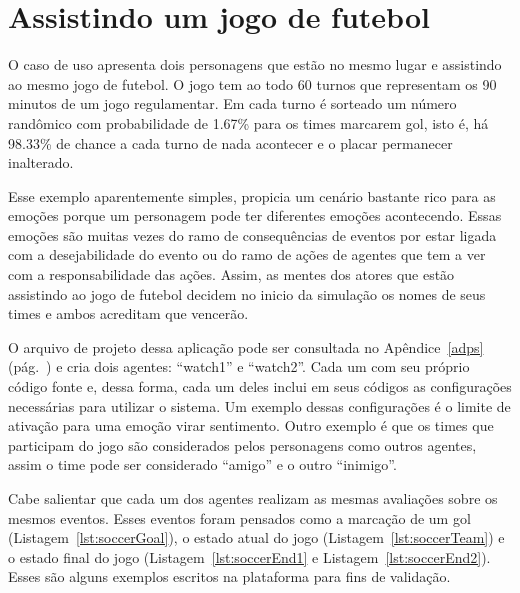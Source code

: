 \section{Assistindo um jogo de futebol} \label{ch:cdu:svc}

O caso de uso apresenta dois personagens que estão no mesmo lugar e assistindo ao mesmo jogo de
futebol. O jogo tem ao todo 60 turnos que representam os 90 minutos de um jogo
regulamentar. Em cada turno é sorteado um número randômico com probabilidade
de 1.67\% para os times marcarem gol, isto é, há 98.33\% de
chance a cada turno de nada acontecer e o placar permanecer inalterado.

Esse exemplo aparentemente simples, propicia um cenário bastante rico para as
emoções porque um personagem pode ter diferentes emoções acontecendo.
Essas emoções são muitas vezes do ramo de consequências de eventos por
estar ligada com a desejabilidade do evento ou do ramo de ações de agentes que
tem a ver com a responsabilidade das ações. Assim, as mentes dos atores que estão
assistindo ao jogo de futebol decidem no inicio da simulação os nomes de seus
times e ambos acreditam que vencerão.

O arquivo de projeto dessa aplicação pode ser consultada no Apêndice~\ref{adps}
(pág.~\pageref{adps}) e cria dois agentes:
``watch1'' e ``watch2''. Cada um com seu próprio código fonte e,
dessa forma, cada um deles inclui em seus códigos as configurações
necessárias para utilizar o sistema. Um exemplo dessas configurações
é o limite de ativação para uma emoção virar sentimento. Outro exemplo é que
os times que participam do jogo são considerados pelos personagens como outros
agentes, assim o time pode ser considerado ``amigo'' e o outro ``inimigo''.

Cabe salientar que cada um dos agentes realizam as mesmas avaliações sobre os
mesmos eventos. Esses eventos foram pensados como a marcação de um gol
(Listagem~\ref{lst:soccerGoal}), o estado atual do jogo
(Listagem~\ref{lst:soccerTeam}) e  o estado final do jogo
(Listagem~\ref{lst:soccerEnd1} e Listagem~\ref{lst:soccerEnd2}).
Esses são alguns exemplos escritos na plataforma \jason para
fins de validação.

